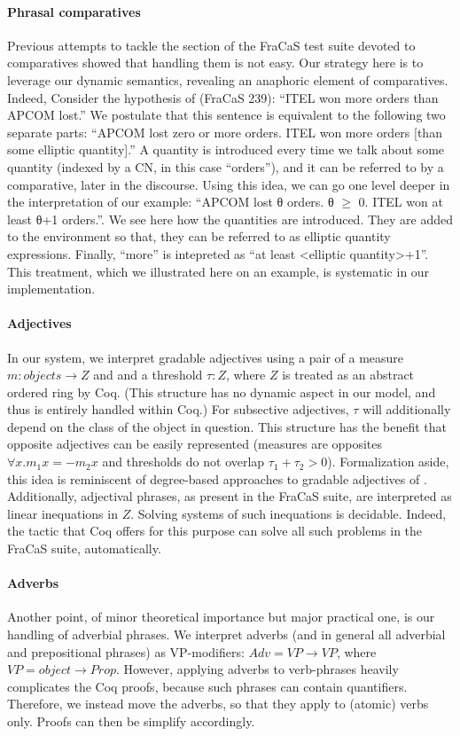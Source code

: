 \documentclass[11pt]{article}
\begin{document}
\paragraph{Phrasal comparatives}
Previous attempts to tackle the section of the FraCaS test suite
devoted to comparatives showed that handling them is not easy. Our
strategy here is to leverage our dynamic semantics, revealing an
anaphoric element of comparatives. Indeed, Consider the hypothesis of
(FraCaS 239): ``ITEL won more orders than APCOM lost.''  We postulate
that this sentence is equivalent to the following two separate parts:
``APCOM lost zero or more orders. ITEL won more orders [than some
elliptic quantity].''  A quantity is introduced every time we talk
about some quantity (indexed by a CN, in this case ``orders''), and it
can be referred to by a comparative, later in the discourse. Using
this idea, we can go one level deeper in the interpretation of our
example: ``APCOM lost θ orders. θ $\ge$ 0.  ITEL won at least θ+1
orders.''. We see here how the quantities are introduced. They are
added to the environment so that, they can be referred to as elliptic
quantity expressions. Finally, ``more'' is intepreted as ``at least
<elliptic quantity>+1''. This treatment, which we illustrated here on
an example, is systematic in our implementation.


\paragraph{Adjectives}
In our system, we interpret gradable adjectives using a pair of a
measure $m : objects → Z$ and and a threshold $τ : Z$, where $Z$ is
treated as an abstract ordered ring by Coq. (This structure has no
dynamic aspect in our model, and thus is entirely handled within Coq.)
For subsective adjectives, $τ$ will additionally depend on the class
of the object in question. This structure has the benefit that
opposite adjectives can be easily represented (measures are opposites
$∀x. m_1 x = -m_2 x$ and thresholds do not overlap $τ_1 + τ_2 >
0$). Formalization aside, this idea is reminiscent of degree-based
approaches to gradable adjectives of
\citet{Cresswell:1976,Kennedy:2007}.  Additionally,
adjectival phrases, as present in the FraCaS suite, are interpreted as
linear inequations in $Z$. Solving systems of such inequations is
decidable. Indeed, the tactic that Coq offers for this purpose can
solve all such problems in the FraCaS suite, automatically.


\paragraph{Adverbs}
Another point, of minor theoretical importance but major practical
one, is our handling of adverbial phrases. We interpret adverbs (and
in general all adverbial and prepositional phrases) as VP-modifiers:
$Adv = VP → VP$, where $VP = object → Prop$. However, applying adverbs
to verb-phrases heavily complicates the Coq proofs, because such
phrases can contain quantifiers. Therefore, we instead move the
adverbs, so that they apply to (atomic) verbs only. Proofs can then be
simplify accordingly. 
\end{document}
